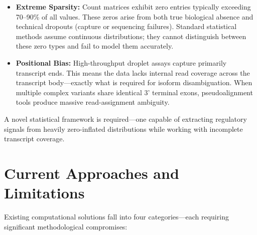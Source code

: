 \begin{itemize}
    \item \textbf{Extreme Sparsity:} Count matrices exhibit zero entries typically exceeding 70–90\% of all values. These zeros arise from both true biological absence and technical dropouts (capture or sequencing failures). Standard statistical methods assume continuous distributions; they cannot distinguish between these zero types and fail to model them accurately.
    
    \item \textbf{Positional Bias:} High-throughput droplet assays capture primarily transcript ends. This means the data lacks internal read coverage across the transcript body—exactly what is required for isoform disambiguation. When multiple complex variants share identical 3' terminal exons, pseudoalignment tools produce massive read-assignment ambiguity.
\end{itemize}

A novel statistical framework is required—one capable of extracting regulatory signals from heavily zero-inflated distributions while working with incomplete transcript coverage.

\section{Current Approaches and Limitations}
Existing computational solutions fall into four categories—each requiring significant methodological compromises:

